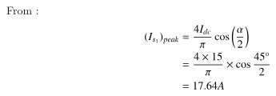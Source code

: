 \documentclass[journal,12pt,onecolumn]{IEEEtran}
\theoremstyle{remark}
\begin{document}

\begin{figure}[!h]
    \centering
    
\end{figure}
\begin{figure}[!h]
    \centering
    
\end{figure}
\begin{figure}[!h]
    \centering
    
\end{figure}
\begin{figure}[!h]
    \centering
    
\end{figure}

From :
\begin{align}
   (I_{s_1})_{peak} &= \frac{4I_{dc}}{\pi}\cos{\left(\frac{\alpha}{2}\right)}\\
    &= \frac{4 \times 15 }{\pi}\times \cos{\frac{45 \degree}{2}}\\
    &=17.64 A 
\end{align}
\end{document}

